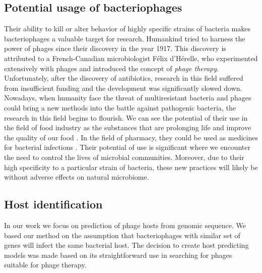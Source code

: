 \subsection{Potential usage of bacteriophages}
Their ability to kill or alter behavior of highly specific strains of bacteria makes bacteriophages a valuable target for research.
Humankind tried to harness the power of phages since their discovery in the year 1917.
This discovery is attributed to a French-Canadian microbiologist Félix d'Hérelle, who experimented extensively with phages and introduced the concept of \emph{phage therapy}\cite{phages_in_nature}.
Unfortunately, after the discovery of antibiotics, research in this field suffered from insufficient funding and the development was significantly slowed down.\\
Nowadays, when humanity face the threat of multiresistant bacteria and phages could bring a new methods into the battle against pathogenic bacteria, the research in this field begins to flourish.
We can see the potential of their use in the field of food industry as the substances that are prolonging life and improve the quality of our food \cite{foodphage}.
In the field of pharmacy, they could be used as medicines for bacterial infections \cite{drugphage}.
Their potential of use is significant where we encounter the need to control the lives of microbial communities.
Moreover, due to their high specificity to a particular strain of bacteria, these new practices will likely be without adverse effects on natural microbiome.


\subsection{Host identification}
In our work we focus on prediction of phage hosts from genomic sequence.
We based our method on the assumption that bacteriophages with similar set of genes will infect the same bacterial host.
The decision to create host predicting models was made based on its straightforward use in searching for phages suitable for phage therapy.

